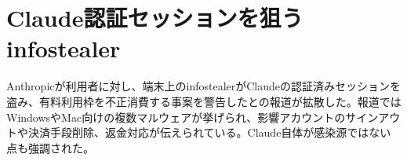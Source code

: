 \section{Claude認証セッションを狙うinfostealer}
Anthropicが利用者に対し、端末上のinfostealerがClaudeの認証済みセッションを盗み、有料利用枠を不正消費する事案を警告したとの報道が拡散した。報道ではWindowsやMac向けの複数マルウェアが挙げられ、影響アカウントのサインアウトや決済手段削除、返金対応が伝えられている。Claude自体が感染源ではない点も強調された。
